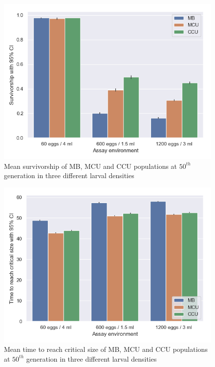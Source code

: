 \begin{figure}[p]
  \centering
  \includegraphics[width=.75\textwidth]{C4/Figs/larval_survc4}
  \caption{Mean survivorship of MB, MCU and CCU populations at $50^{th}$ generation in three different larval densities}
  \label{fig:lh-sur}
\end{figure}
\begin{figure}[p]
  \centering
  \includegraphics[width=.75\textwidth]{C4/Figs/larval_alive_devtc4}
  \caption{Mean time to reach critical size of MB, MCU and CCU populations at $50^{th}$ generation in three different larval densities}
  \label{fig:lh-dt}
\end{figure}
\pagebreak
